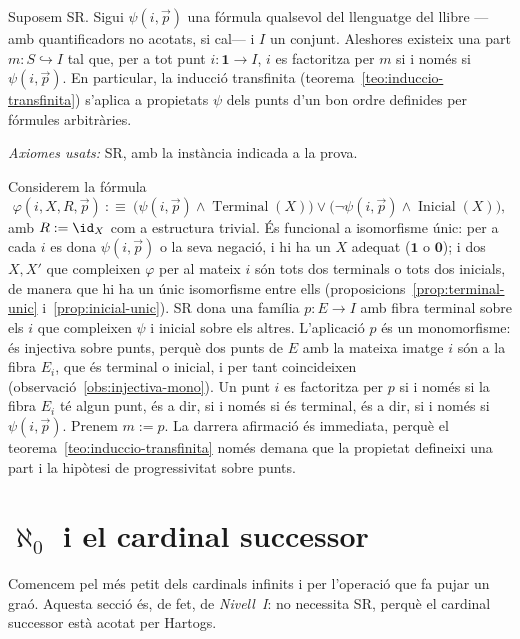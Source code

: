 \begin{lema}\label{lema:separacio-sr}
Suposem SR. Sigui \(\psi(i,\vec p)\) una fórmula qualsevol del llenguatge del
llibre ---amb quantificadors no acotats, si cal--- i \(I\) un conjunt. Aleshores
existeix una part \(m\colon S\hookrightarrow I\) tal que, per a tot punt
\(i\colon\mathbf1\to I\), \(i\) es factoritza per \(m\) si i només si
\(\psi(i,\vec p)\). En particular, la inducció transfinita
(teorema~\ref{teo:induccio-transfinita}) s'aplica a propietats
\(\psi\) dels punts d'un bon ordre definides per fórmules arbitràries.\par
\emph{Axiomes usats:} SR, amb la instància indicada a la prova.
\end{lema}

\begin{prova}
Considerem la fórmula
\[
\varphi(i,X,R,\vec p)\ :\equiv\
\bigl(\psi(i,\vec p)\land\operatorname{Terminal}(X)\bigr)\lor
\bigl(\neg\psi(i,\vec p)\land\operatorname{Inicial}(X)\bigr),
\]
amb \(R:=\id_X\) com a estructura trivial. És funcional a isomorfisme únic:
per a cada \(i\) es dona \(\psi(i,\vec p)\) o la seva negació, i hi ha un \(X\)
adequat (\(\mathbf1\) o \(\mathbf0\)); i dos \(X,X'\) que compleixen
\(\varphi\) per al mateix \(i\) són tots dos terminals o tots dos inicials, de
manera que hi ha un únic isomorfisme entre ells
(proposicions~\ref{prop:terminal-unic} i~\ref{prop:inicial-unic}). SR dona una
família \(p\colon E\to I\) amb fibra terminal sobre els \(i\) que compleixen
\(\psi\) i inicial sobre els altres. L'aplicació \(p\) és un monomorfisme: és
injectiva sobre punts, perquè dos punts de \(E\) amb la mateixa imatge \(i\)
són a la fibra \(E_i\), que és terminal o inicial, i per tant coincideixen
(observació~\ref{obs:injectiva-mono}). Un punt \(i\) es factoritza per \(p\)
si i només si la fibra \(E_i\) té algun punt, és a dir, si i només si és
terminal, és a dir, si i només si \(\psi(i,\vec p)\). Prenem \(m:=p\). La
darrera afirmació és immediata, perquè el teorema~\ref{teo:induccio-transfinita}
només demana que la propietat defineixi una part i la hipòtesi de
progressivitat sobre punts.
\end{prova}

\section{\texorpdfstring{\(\aleph_0\)}{aleph 0} i el cardinal successor}\label{sec:aleph0-successor}

Comencem pel més petit dels cardinals infinits i per l'operació que fa pujar un
graó. Aquesta secció és, de fet, de \emph{Nivell~I}: no necessita SR, perquè el
cardinal successor està acotat per Hartogs.


